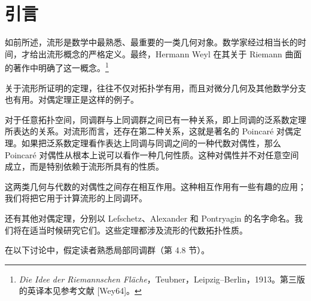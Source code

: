 \section{引言}
如前所述，流形是数学中最熟悉、最重要的一类几何对象。数学家经过相当长的时间，才给出流形概念的严格定义。最终，Hermann Weyl 在其关于 Riemann 曲面的著作中明确了这一概念。\footnote{\textit{Die Idee der Riemannschen Fläche}，Teubner，Leipzig--Berlin，1913。第三版的英译本见参考文献 [Wey64]。}

关于流形所证明的定理，往往不仅对拓扑学有用，而且对微分几何及其他数学分支也有用。对偶定理正是这样的例子。

对于任意拓扑空间，同调群与上同调群之间已有一种关系，即上同调的泛系数定理所表达的关系。对流形而言，还存在第二种关系，这就是著名的 Poincaré 对偶定理。如果把泛系数定理看作表达上同调与同调之间的一种代数对偶性，那么 Poincaré 对偶性从根本上说可以看作一种几何性质。这种对偶性并不对任意空间成立，而是特别依赖于流形所具有的性质。

这两类几何与代数的对偶性之间存在相互作用。这种相互作用有一些有趣的应用；我们将把它用于计算流形的上同调环。

还有其他对偶定理，分别以 Lefschetz、Alexander 和 Pontryagin 的名字命名。我们将在适当时候研究它们。这些定理都涉及流形的代数拓扑性质。

在以下讨论中，假定读者熟悉局部同调群（第 4.8 节）。
